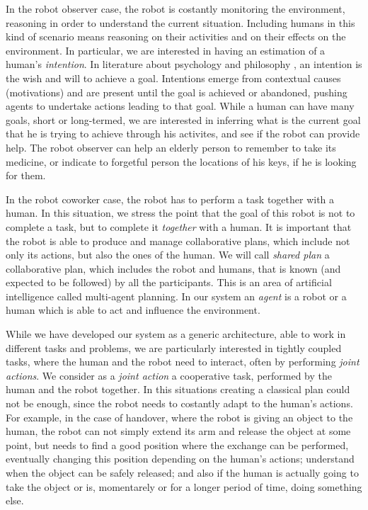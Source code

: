 In the robot observer case, the robot is costantly monitoring the environment, reasoning in order to understand the current situation.  Including humans in this kind of scenario means reasoning on their activities and on their effects on the environment. In particular, we are interested in having an estimation of a human's \textit{intention}. In literature about psychology \citep{bruner1981} and philosophy \citep{bratman1984}, an intention is the wish and will to achieve a goal. Intentions emerge from contextual causes (motivations) and are present until the goal is achieved or abandoned, pushing agents to undertake actions leading to that goal. While a human can have many goals, short or long-termed, we are interested in inferring what is the current goal that he is trying to achieve through his activites, and see if the robot can provide help. The robot observer can help an elderly person to remember to take its medicine, or indicate to forgetful person the locations of his keys, if he is looking for them.

In the robot coworker case, the robot has to perform a task together with a human. In this situation, we stress the point that the goal of this robot is not to complete a task, but to complete it \textit{together} with a human.  It is important that the robot is able to produce and manage collaborative plans, which include not only its actions, but also the ones of the human. We will call \textit{shared plan} a collaborative plan, which includes the robot and humans, that is known (and expected to be followed) by all the participants.
This is an area of artificial intelligence called multi-agent planning. In our system an \textit{agent} is a robot or a human which is able to act and influence the environment. 

While we have developed our system as a generic architecture, able to work in different tasks and problems, we are particularly interested in tightly coupled tasks, where the human and the robot need to interact, often by performing \textit{joint actions}. We consider as a \textit{joint action} a cooperative task, performed by the human and the robot together. In this situations creating a classical plan could not be enough, since the robot needs to costantly adapt to the human's actions. For example, in the case of handover, where the robot is giving an object to the human, the robot can not simply extend its arm and release the object at some point, but needs to find a good position where the exchange can be performed, eventually changing this position depending on the human's actions; understand when the object can be safely released; and also if the human is actually going to take the object or is, momentarely or for a longer period of time, doing something else.

